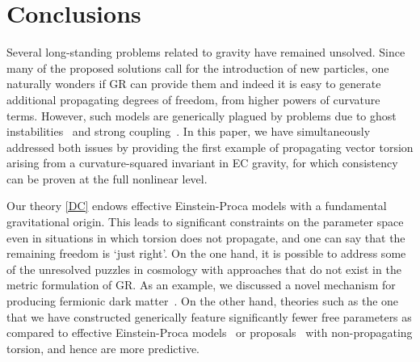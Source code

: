 \documentclass[aps,prd,reprint,preprintnumbers,showpacs,floatfix,nofootinbib,superscript address,longbibliography]{revtex4-1}
\begin{document}
\section{Conclusions} 
Several long-standing problems related to gravity have remained unsolved. Since many of the proposed solutions call for the introduction of new particles, one naturally wonders if GR can provide them and indeed it is easy to generate additional propagating degrees of freedom, \eg from higher powers of curvature terms. However, such models are generically plagued by problems due to ghost instabilities~\cite{Stelle:1977ry,Neville:1978bk,Neville:1979rb,Sezgin:1979zf,Hayashi:1979wj, Hayashi:1980qp} and strong coupling~\cite{Hecht:1996np,Yo:1999ex,Yo:2001sy}. In this paper, we have simultaneously addressed both issues by providing the first example of propagating vector torsion  arising from a curvature-squared invariant in EC gravity, for which consistency can be proven at the full nonlinear level.

Our theory \eqref{DC} endows effective Einstein-Proca models with a fundamental gravitational origin. This leads to significant constraints on the parameter space even in situations in which torsion does not propagate, and one can say that the remaining freedom is `just right'. On the one hand, it is possible to address some of the unresolved puzzles in cosmology with approaches that do not exist in the metric formulation of GR. As an example, we discussed a novel mechanism for producing fermionic dark matter~\cite{Shaposhnikov:2020aen}. On the other hand, theories such as the one that we have constructed generically feature significantly fewer free parameters as compared to effective Einstein-Proca models~\cite{Bekenstein:1971hc,Ford:1989me,Armendariz-Picon:2004say,Koivisto:2007bp,Golovnev:2008cf,Chiba:2008eh,Koivisto:2008xf,Kanno:2008gn,Koivisto:2008xf,Hambye:2008bq,Hambye:2009fg,Arina:2009uq,Hisano:2010yh,Diaz-Cruz:2010czr,Lebedev:2011iq,Farzan:2012hh,Baek:2012se,Tasinato:2014eka,DeFelice:2016yws,Emami:2016ldl,DeFelice:2016uil,BeltranJimenez:2016afo,deFelice:2017paw,Heisenberg:2017hwb,Rodriguez:2017wkg,Nakamura:2018oyy,Heisenberg:2020xak,Arcadi:2020jqf,Benisty:2021sul,deRham:2021efp,Barman:2021qds,Garcia-Saenz:2021uyv} or proposals~\cite{Freidel:2005sn,Bauer:2008zj,Poplawski:2011xf,Diakonov:2011fs,Khriplovich:2012xg,Magueijo:2012ug,Khriplovich:2013tqa,Markkanen:2017tun,Carrilho:2018ffi,Enckell:2018hmo,Rasanen:2018fom,Rubio:2019ypq,Shaposhnikov:2020geh,Karananas:2020qkp,Langvik:2020nrs,Shaposhnikov:2020gts,Mikura:2020qhc,Shaposhnikov:2020aen,Kubota:2020ehu,Enckell:2020lvn,Iosifidis:2021iuw,Racioppi:2021ynx,Cheong:2021kyc,Dioguardi:2021fmr,Piani:2022gon,Dux:2022kuk,Rasanen:2022ijc,Gialamas:2023emn,Gialamas:2023flv,Piani:2023aof,Poisson:2023tja,Rigouzzo:2023sbb} with non-propagating torsion, and hence are more predictive. 
\end{document}

